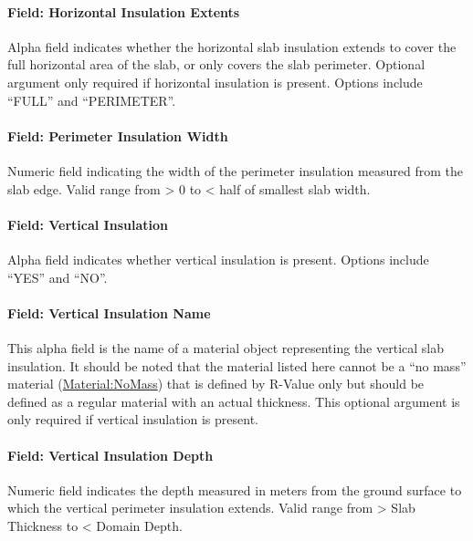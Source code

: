 \paragraph{Field: Horizontal Insulation Extents}\label{field-horizontal-insulation-extents}

Alpha field indicates whether the horizontal slab insulation extends to cover the full horizontal area of the slab, or only covers the slab perimeter. Optional argument only required if horizontal insulation is present. Options include ``FULL'' and ``PERIMETER''.

\paragraph{Field: Perimeter Insulation Width}\label{field-perimeter-insulation-width}

Numeric field indicating the width of the perimeter insulation measured from the slab edge. Valid range from \textgreater{} 0 to \textless{} half of smallest slab width.

\paragraph{Field: Vertical Insulation}\label{field-vertical-insulation}

Alpha field indicates whether vertical insulation is present. Options include ``YES'' and ``NO''.

\paragraph{Field: Vertical Insulation Name}\label{field-vertical-insulation-name}

This alpha field is the name of a material object representing the vertical slab insulation. It should be noted that the material listed here cannot be a ``no mass'' material  (\hyperref[materialnomass]{Material:NoMass}) that is defined by R-Value only but should be defined as a regular material with an actual thickness. This optional argument is only required if vertical insulation is present.

\paragraph{Field: Vertical Insulation Depth}\label{field-vertical-insulation-depth}

Numeric field indicates the depth measured in meters from the ground surface to which the vertical perimeter insulation extends. Valid range from \textgreater{} Slab Thickness to \textless{} Domain Depth.

